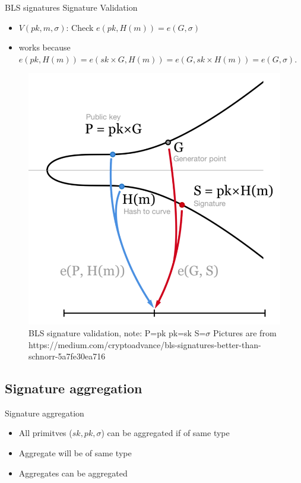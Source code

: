 \documentclass{beamer}
\begin{document}
\begin{frame}{BLS signatures}
	Signature Validation
	\begin{itemize}
		\item $V(pk, m, \sigma)$: Check $e(pk,H(m)) = e(G,\sigma)$
		\item works because $e(pk,H(m)) = e(sk\times{G},H(m)) = e(G,sk\times{H(m)}) = e(G, \sigma)$.
	\end{itemize}
	\begin{figure}[hb!]
		\centering
		\includegraphics[width=0.37\linewidth]{bls-verify}
		\caption{BLS signature validation, note: P=pk pk=sk S=$\sigma$ \newline
			{\tiny Pictures are from https://medium.com/cryptoadvance/bls-signatures-better-than-schnorr-5a7fe30ea716}}
	\end{figure}
\end{frame}
\subsection{Signature aggregation}
\begin{frame}{Signature aggregation}
	\begin{itemize}
		\item All primitves ($sk, pk, \sigma$) can be aggregated if of same type
		\item Aggregate will be of same type
		\item Aggregates can be aggregated
	\end{itemize}
\end{frame}
\end{document}
